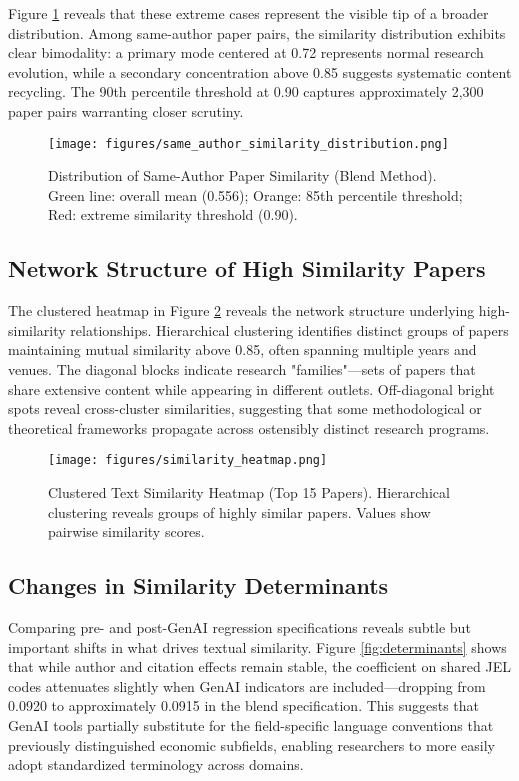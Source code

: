 \documentclass[12pt]{article}
\begin{document}
Figure \ref{fig:distribution} reveals that these extreme cases represent the visible tip of a broader distribution. Among same-author paper pairs, the similarity distribution exhibits clear bimodality: a primary mode centered at 0.72 represents normal research evolution, while a secondary concentration above 0.85 suggests systematic content recycling. The 90th percentile threshold at 0.90 captures approximately 2,300 paper pairs warranting closer scrutiny.

\begin{figure}[htbp]
\centering
\texttt{[image: figures/same\_author\_similarity\_distribution.png]}
\caption{Distribution of Same-Author Paper Similarity (Blend Method). Green line: overall mean (0.556); Orange: 85th percentile threshold; Red: extreme similarity threshold (0.90).}
\label{fig:distribution}
\end{figure}

\subsection{Network Structure of High Similarity Papers}

The clustered heatmap in Figure \ref{fig:heatmap} reveals the network structure underlying high-similarity relationships. Hierarchical clustering identifies distinct groups of papers maintaining mutual similarity above 0.85, often spanning multiple years and venues. The diagonal blocks indicate research "families"—sets of papers that share extensive content while appearing in different outlets. Off-diagonal bright spots reveal cross-cluster similarities, suggesting that some methodological or theoretical frameworks propagate across ostensibly distinct research programs.

\begin{figure}[htbp]
\centering
\texttt{[image: figures/similarity\_heatmap.png]}
\caption{Clustered Text Similarity Heatmap (Top 15 Papers). Hierarchical clustering reveals groups of highly similar papers. Values show pairwise similarity scores.}
\label{fig:heatmap}
\end{figure}

\subsection{Changes in Similarity Determinants}

Comparing pre- and post-GenAI regression specifications reveals subtle but important shifts in what drives textual similarity. Figure \ref{fig:determinants} shows that while author and citation effects remain stable, the coefficient on shared JEL codes attenuates slightly when GenAI indicators are included—dropping from 0.0920 to approximately 0.0915 in the blend specification. This suggests that GenAI tools partially substitute for the field-specific language conventions that previously distinguished economic subfields, enabling researchers to more easily adopt standardized terminology across domains.
\end{document}
